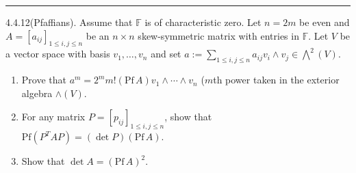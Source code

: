 \documentclass[a4paper, 12pt]{article}
\begin{document}
\noindent\rule{7in}{2.8pt}
\begin{problem}{4.4.12(Pfaffians).}
Assume that \(\mathbb{F}\) is of characteristic zero. Let \(n=2m\) be even and \(A=[a_{ij}]_{1\leq i,j\leq n}\) be an \(n\times n\) skew-symmetric matrix with entries in \(\mathbb{F}\). Let \(V\) be a vector space with basis \(v_1,\ldots,v_n\) and 
set \(a:=\sum_{1\leq i,j\leq n} a_{ij}v_i\wedge v_j\in \bigwedge^2(V)\).
\begin{enumerate}[(1)]
\item Prove that \(a^m=2^m m!(\text{Pf}\, A)v_1\wedge \cdots\wedge v_n\) (\(m\)th power taken in the exterior algebra \(\wedge(V)\).
\item For any matrix \(P=[p_{ij}]_{1\leq i,j\leq n}\), show that \(\text{Pf}(P^T AP)=(\det P)(\text{Pf}\, A)\).
\item Show that \(\det A=(\text{Pf}\, A)^2\).
\end{enumerate}
\end{problem}
\begin{solution}
	
\end{solution}
\end{document}
